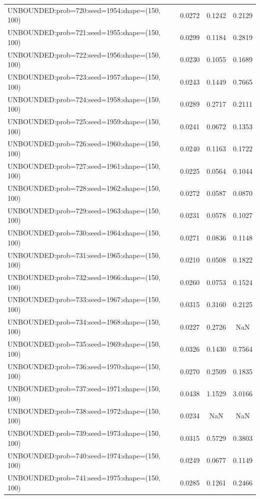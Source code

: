 \begin{longtable}{lccc}
UNBOUNDED:prob=720:seed=1954:shape=(150, 100) &   0.0272 &  0.1242 &  0.2129 \\
UNBOUNDED:prob=721:seed=1955:shape=(150, 100) &   0.0299 &  0.1184 &  0.2819 \\
UNBOUNDED:prob=722:seed=1956:shape=(150, 100) &   0.0230 &  0.1055 &  0.1689 \\
UNBOUNDED:prob=723:seed=1957:shape=(150, 100) &   0.0243 &  0.1449 &  0.7665 \\
UNBOUNDED:prob=724:seed=1958:shape=(150, 100) &   0.0289 &  0.2717 &  0.2111 \\
UNBOUNDED:prob=725:seed=1959:shape=(150, 100) &   0.0241 &  0.0672 &  0.1353 \\
UNBOUNDED:prob=726:seed=1960:shape=(150, 100) &   0.0240 &  0.1163 &  0.1722 \\
UNBOUNDED:prob=727:seed=1961:shape=(150, 100) &   0.0225 &  0.0564 &  0.1044 \\
UNBOUNDED:prob=728:seed=1962:shape=(150, 100) &   0.0272 &  0.0587 &  0.0870 \\
UNBOUNDED:prob=729:seed=1963:shape=(150, 100) &   0.0231 &  0.0578 &  0.1027 \\
UNBOUNDED:prob=730:seed=1964:shape=(150, 100) &   0.0271 &  0.0836 &  0.1148 \\
UNBOUNDED:prob=731:seed=1965:shape=(150, 100) &   0.0210 &  0.0508 &  0.1822 \\
UNBOUNDED:prob=732:seed=1966:shape=(150, 100) &   0.0260 &  0.0753 &  0.1524 \\
UNBOUNDED:prob=733:seed=1967:shape=(150, 100) &   0.0315 &  0.3160 &  0.2125 \\
UNBOUNDED:prob=734:seed=1968:shape=(150, 100) &   0.0227 &  0.2726 &     NaN \\
UNBOUNDED:prob=735:seed=1969:shape=(150, 100) &   0.0326 &  0.1430 &  0.7564 \\
UNBOUNDED:prob=736:seed=1970:shape=(150, 100) &   0.0270 &  0.2509 &  0.1835 \\
UNBOUNDED:prob=737:seed=1971:shape=(150, 100) &   0.0438 &  1.1529 &  3.0166 \\
UNBOUNDED:prob=738:seed=1972:shape=(150, 100) &   0.0234 &     NaN &     NaN \\
UNBOUNDED:prob=739:seed=1973:shape=(150, 100) &   0.0315 &  0.5729 &  0.3803 \\
UNBOUNDED:prob=740:seed=1974:shape=(150, 100) &   0.0249 &  0.0677 &  0.1149 \\
UNBOUNDED:prob=741:seed=1975:shape=(150, 100) &   0.0285 &  0.1261 &  0.2466 \\

\end{longtable}
